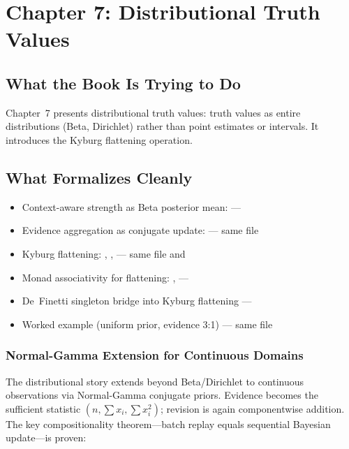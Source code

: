 \documentclass[11pt,openany]{report}
\begin{document}
\chapter{Chapter 7: Distributional Truth Values}
\label{ch:review-ch7}

\section{What the Book Is Trying to Do}

Chapter~7 presents distributional truth values: truth values as entire
distributions (Beta, Dirichlet) rather than point estimates or intervals.
It introduces the Kyburg flattening operation.

\section{What Formalizes Cleanly}

\begin{itemize}
\item Context-aware strength as Beta posterior mean:
   ---
\item Evidence aggregation as conjugate update:
   --- same file
\item Kyburg flattening: ,
  ,  ---
  same file and 
\item Monad associativity for flattening:
  ,  ---
\item De~Finetti singleton bridge into Kyburg flattening ---
\item Worked example (uniform prior, evidence 3:1) ---
  same file
\end{itemize}

\subsection{Normal-Gamma Extension for Continuous Domains}

The distributional story extends beyond Beta/Dirichlet to continuous
observations via Normal-Gamma conjugate priors.  Evidence becomes the
sufficient statistic $(n, \sum x_i, \sum x_i^2)$; revision is again
componentwise addition.  The key compositionality theorem---batch
replay equals sequential Bayesian update---is proven:
\end{document}
